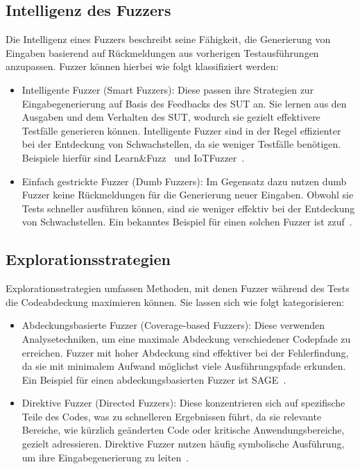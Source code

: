 \subsection{Intelligenz des Fuzzers}\label{subsec:intelligenz-des-fuzzers}
Die Intelligenz eines Fuzzers beschreibt seine Fähigkeit, die Generierung von Eingaben basierend auf Rückmeldungen aus
vorherigen Testausführungen anzupassen.
Fuzzer können hierbei wie folgt klassifiziert werden:
\begin{itemize}
    \item Intelligente Fuzzer (Smart Fuzzers): Diese passen ihre Strategien zur Eingabegenerierung auf Basis des Feedbacks
    des SUT an.
    Sie lernen aus den Ausgaben und dem Verhalten des SUT, wodurch sie gezielt effektivere Testfälle generieren können.
    Intelligente Fuzzer sind in der Regel effizienter bei der Entdeckung von Schwachstellen, da sie weniger Testfälle benötigen.
    Beispiele hierfür sind Learn\&Fuzz~\cite{godefroid2017learnfuzzmachinelearninginput} und IoTFuzzer~\cite{noauthor_iotfuzzer_nodate}.
    \item Einfach gestrickte Fuzzer (Dumb Fuzzers): Im Gegensatz dazu nutzen dumb Fuzzer keine Rückmeldungen für die
    Generierung neuer Eingaben.
    Obwohl sie Tests schneller ausführen können, sind sie weniger effektiv bei der Entdeckung von Schwachstellen.
    Ein bekanntes Beispiel für einen solchen Fuzzer ist zzuf~\cite{zzuf}.
\end{itemize}
\subsection{Explorationsstrategien}\label{subsec:explorationsstrategien}
Explorationsstrategien umfassen Methoden, mit denen Fuzzer während des Tests die Codeabdeckung maximieren können. 
Sie lassen sich wie folgt kategorisieren:
\begin{itemize}
    \item Abdeckungsbasierte Fuzzer (Coverage-based Fuzzers): Diese verwenden Analysetechniken, um eine maximale Abdeckung
    verschiedener Codepfade zu erreichen.
    Fuzzer mit hoher Abdeckung sind effektiver bei der Fehlerfindung, da sie mit minimalem Aufwand möglichst viele
    Ausführungspfade erkunden.
    Ein Beispiel für einen abdeckungsbasierten Fuzzer ist SAGE~\cite{godefroid_sage_2012}.
    \item Direktive Fuzzer (Directed Fuzzers): Diese konzentrieren sich auf spezifische Teile des Codes, was zu
    schnelleren Ergebnissen führt, da sie relevante Bereiche, wie kürzlich geänderten Code oder kritische Anwendungsbereiche,
    gezielt adressieren.
    Direktive Fuzzer nutzen häufig symbolische Ausführung, um ihre Eingabegenerierung zu leiten~\cite{liang_sequence_2019}.
\end{itemize}
